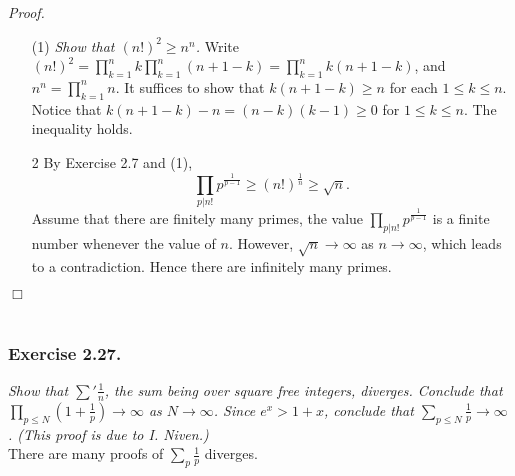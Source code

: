 \documentclass{article}
\begin{document}
\emph{Proof.}
\begin{enumerate}
\item[(1)]
  \emph{Show that $(n!)^2 \geq n^n$.}
  Write
  $(n!)^2 = \prod_{k=1}^n k \prod_{k=1}^n (n + 1 - k) = \prod_{k=1}^n k(n + 1 - k)$,
  and $n^n = \prod_{k=1}^n n$.
  It suffices to show that $k(n + 1 - k) \geq n$ for each $1 \leq k \leq n$.
  Notice that $k(n + 1 - k) - n = (n - k)(k - 1) \geq 0$ for $1 \leq k \leq n$.
  The inequality holds.

\item[2]
  By Exercise 2.7 and (1),
  \[
    \prod_{p|n!} p^{\frac{1}{p - 1}} \geq (n!)^{\frac{1}{n}} \geq \sqrt{n}.
  \]
  Assume that there are finitely many primes,
  the value $\prod_{p|n!} p^{\frac{1}{p - 1}}$ is a finite number
  whenever the value of $n$.
  However, $\sqrt{n} \rightarrow \infty$ as $n \rightarrow \infty$,
  which leads to a contradiction.
  Hence there are infinitely many primes.
\end{enumerate}
$\Box$ \\\\






\subsubsection*{Exercise 2.27.}
\emph{Show that ${\sum}' \frac{1}{n}$, the sum being over square free integers, diverges.
Conclude that $\prod_{p \leq N} ( 1 + \frac{1}{p} ) \rightarrow \infty$ as $N \rightarrow \infty$.
Since $e^x > 1 + x$, conclude that $\sum_{p \leq N} \frac{1}{p} \rightarrow \infty$.
(This proof is due to I. Niven.)} \\

There are many proofs of $\sum_{p} \frac{1}{p}$ diverges. \\
\end{document}
